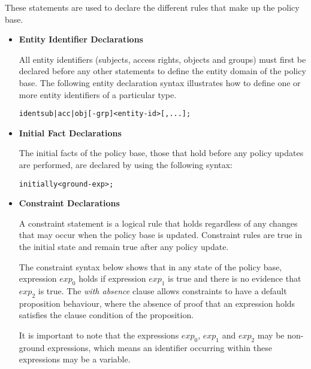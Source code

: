 \documentclass[11pt]{report}
\newenvironment{vverbatim}
{
  \begin{alltt}
}
{
    \vspace{-\baselineskip}
  \end{alltt}
}
\begin{document}
          These statements are used to declare the different rules that make up
          the policy base.

          \begin{itemize}
            \item
              {\bf Entity Identifier Declarations}

              All entity identifiers (subjects, access rights, objects and
              groups) must first be declared before any other statements to
              define the entity domain of the policy base. The following entity
              declaration syntax illustrates how to define one or more entity
              identifiers of a particular type.

              \begin{vverbatim}
  ident sub|acc|obj[-grp] <entity-id>[, ...];
              \end{vverbatim}

            \item
              {\bf Initial Fact Declarations}

              The initial facts of the policy base, those that hold before any
              policy updates are performed, are declared by using the following
              syntax:

              \begin{vverbatim}
  initially <ground-exp>;
              \end{vverbatim}

            \item
              {\bf Constraint Declarations}

              A constraint statement is a logical rule that holds regardless
              of any changes that may occur when the policy base is updated.
              Constraint rules are true in the initial state and remain true
              after any policy update.

              The constraint syntax below shows that in any state of the policy
              base, expression $exp_0$ holds if expression $exp_1$ is true and
              there is no evidence that $exp_2$ is true. The {\em with absence}
              clause allows constraints to have a default proposition
              behaviour, where the absence of proof that an expression holds
              satisfies the clause condition of the proposition.

              It is important to note that the expressions $exp_0$, $exp_1$ and
              $exp_2$ may be non-ground expressions, which means an identifier
              occurring within these expressions may be a variable.


\end{itemize}
\end{document}
